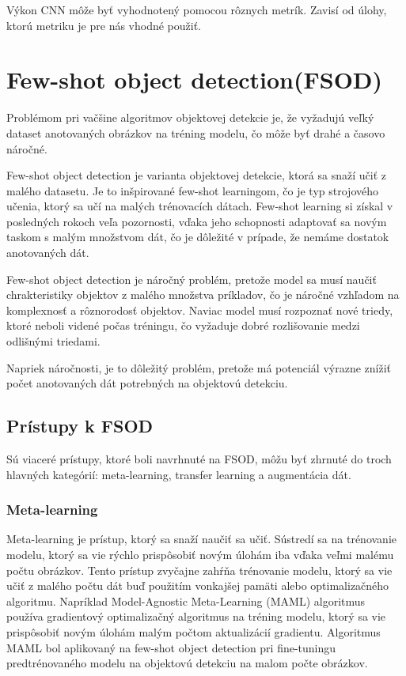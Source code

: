 Výkon CNN môže byť vyhodnotený pomocou rôznych metrík. Zavisí od úlohy, ktorú metriku je pre nás vhodné použiť.

\section{Few-shot object detection(FSOD)}
\hspace{\parindent}Problémom pri vačšine algoritmov objektovej detekcie je, že vyžadujú veľký dataset anotovaných obrázkov na tréning modelu, čo môže byť drahé a časovo náročné. 

Few-shot object detection je varianta objektovej detekcie, ktorá sa snaží učiť z malého datasetu. Je to inšpirované few-shot learningom, čo je typ strojového učenia, ktorý sa učí na malých trénovacích dátach. Few-shot learning si získal v posledných rokoch veľa pozornosti, vďaka jeho schopnosti adaptovať sa novým taskom s malým množstvom dát, čo je dôležité v prípade, že nemáme dostatok anotovaných dát. 

Few-shot object detection je náročný problém, pretože model sa musí naučiť chrakteristiky objektov z malého množstva príkladov, čo je náročné vzhľadom na komplexnosť a rôznorodosť objektov. Naviac model musí rozpoznať nové triedy, ktoré neboli videné počas tréningu, čo vyžaduje dobré rozlišovanie medzi odlišnými triedami. 

Napriek náročnosti, je to dôležitý problém, pretože má potenciál výrazne znížiť počet anotovaných dát potrebných na objektovú detekciu. 

\subsection{Prístupy k FSOD}
\hspace{\parindent}Sú viaceré prístupy, ktoré boli navrhnuté na FSOD, môžu byť zhrnuté do troch hlavných kategórií: meta-learning, transfer learning a augmentácia dát.

\subsubsection{Meta-learning}
\hspace{\parindent}Meta-learning je prístup, ktorý sa snaží naučiť sa učiť. Sústredí sa na trénovanie modelu, ktorý sa vie rýchlo prispôsobiť novým úlohám iba vďaka veľmi malému počtu obrázkov. Tento prístup zvyčajne zahŕňa trénovanie modelu, ktorý sa vie učiť z malého počtu dát buď použitím vonkajšej pamäti alebo optimalizačného algoritmu. Napríklad Model-Agnostic Meta-Learning (MAML) \cite{finn2017model} algoritmus používa gradientový optimalizačný algoritmus na tréning modelu, ktorý sa vie prispôsobiť novým úlohám malým počtom aktualizácií gradientu. Algoritmus MAML bol aplikovaný na few-shot object detection pri fine-tuningu predtrénovaného modelu na objektovú detekciu na malom počte obrázkov.

